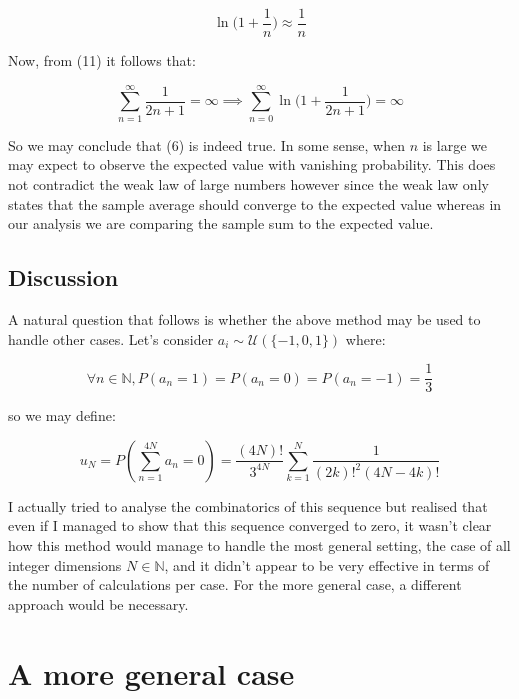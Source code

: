 \documentclass{article}
\begin{document}
\begin{equation}
\ln \big(1+\frac{1}{n}\big) \approx \frac{1}{n}
\end{equation}

Now, from (11) it follows that:

\begin{equation}
\sum_{n=1}^\infty \frac{1}{2n+1} = \infty \implies \sum_{n=0}^{\infty} \ln \big(1+\frac{1}{2n+1}\big) = \infty
\end{equation}

So we may conclude that (6) is indeed true. In some sense, when $n$ is large we may expect to observe the expected value
with vanishing probability. This does not contradict the weak law of large numbers however since the weak law only states that the sample average should converge to the expected value whereas in our analysis we are comparing the sample sum to the expected value. 

\subsection{Discussion}

A natural question that follows is whether the above method may be used to handle other cases. Let's consider $a_i \sim \mathcal{U}(\{-1,0,1\})$ where:

\begin{equation}
\forall n \in \mathbb{N}, P(a_n=1)=P(a_n=0)=P(a_n=-1)=\frac{1}{3}
\end{equation}

so we may define:

\begin{equation}
u_N = P(\sum_{n=1}^{4N} a_n = 0)= \frac{(4N)!}{3^{4N}} \sum_{k=1}^N \frac{1}{(2k)!^2 (4N-4k)!}
\end{equation}

I actually tried to analyse the combinatorics of this sequence but realised that even if I managed to show that this sequence converged to zero,
it wasn't clear how this method would manage to handle the most general setting, the case of all integer dimensions $N \in \mathbb{N}$, and it didn't
appear to be very effective in terms of the number of calculations per case. For the more general case, a different approach would be necessary. 

\section{A more general case}
\end{document}

